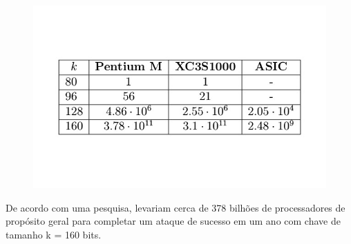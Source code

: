 \documentclass{beamer}
\begin{document}
\begin{frame}
  \begin{figure}
    \includegraphics[scale=0.3]{log_discreto}
  \end{figure}

De acordo com uma pesquisa, levariam cerca de 378 bilhões de processadores de propósito geral para completar um ataque de sucesso em um ano com chave de tamanho k = 160 bits.

\end{frame}

%
%

\end{document}
